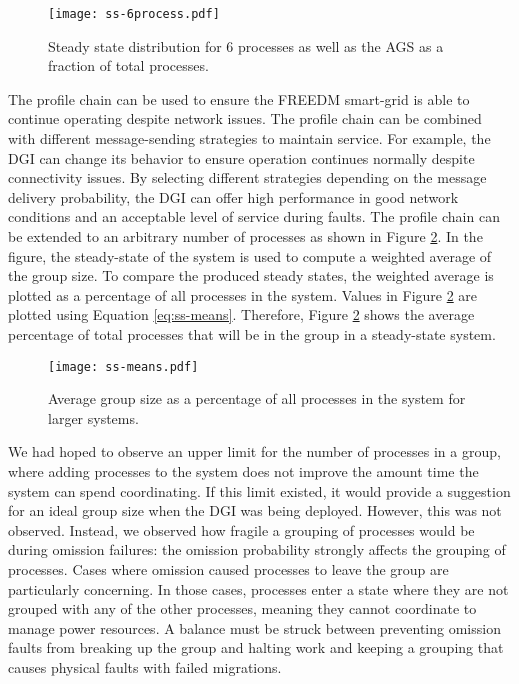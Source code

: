 \begin{figure}[htbp]
    \centering
    \texttt{[image: ss-6process.pdf]}
    \caption{Steady state distribution for 6 processes as well as the \ac{AGS} as a fraction of total processes.}
    \label{fig:ss-6process}
\end{figure}

The profile chain can be used to ensure the \ac{FREEDM} smart-grid is able to continue operating despite network issues.
The profile chain can be combined with different message-sending strategies to maintain service.
For example, the DGI can change its behavior to ensure operation continues normally despite connectivity issues.
By selecting different strategies depending on the message delivery probability, the DGI can offer high performance in good network conditions and an acceptable level of service during faults.
The profile chain can be extended to an arbitrary number of processes as shown in Figure \ref{fig:ss-means}.
In the figure, the steady-state of the system is used to compute a weighted average of the group size.
To compare the produced steady states, the weighted average is plotted as a percentage of all processes in the system.
Values in Figure \ref{fig:ss-means} are plotted using Equation \ref{eq:ss-means}.
Therefore, Figure \ref{fig:ss-means} shows the average percentage of total processes that will be in the group in a steady-state system.

\begin{figure}[htbp]
    \centering
    \texttt{[image: ss-means.pdf]}
    \caption{Average group size as a percentage of all processes in the system for larger systems.}
    \label{fig:ss-means}
\end{figure}

We had hoped to observe an upper limit for the number of processes in a group, where adding processes to the system does not improve the amount time the system can spend coordinating.
If this limit existed, it would provide a suggestion for an ideal group size when the DGI was being deployed.
However, this was not observed.
Instead, we observed how fragile a grouping of processes would be during omission failures: the omission probability strongly affects the grouping of processes.
Cases where omission caused processes to leave the group are particularly concerning. 
In those cases, processes enter a state where they are not grouped with any of the other processes, meaning they cannot coordinate to manage power resources.
A balance must be struck between preventing omission faults from breaking up the group and halting work and keeping a grouping that causes physical faults with failed migrations.


